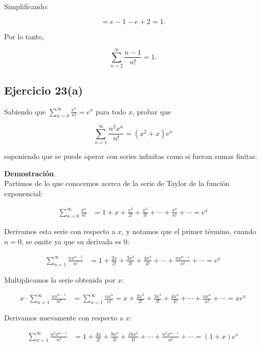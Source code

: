\documentclass{article}
\begin{document}
    Simplificando:

    $$
    = e - 1 - e + 2 = 1.
    $$

    Por lo tanto,

    $$
    \sum_{n=2}^{\infty} \frac{n-1}{n!} = 1.
    $$

    \subsection*{Ejercicio 23(a)}

    Sabiendo que $\sum_{n=0}^{\infty} \frac{x^{n}}{n!}=e^{x}$ para todo $x$, probar que

    $$
    \sum_{n=1}^{\infty} \frac{n^{2} x^{n}}{n!}=\left(x^{2}+x\right) e^{x}
    $$

    suponiendo que se puede operar con series infinitas como si fueran sumas finitas.

    \textbf{Demostración}.\\

    Partimos de lo que conocemos acerca de la serie de Taylor de la función exponencial:

    \begin{align*}
    \sum_{n=0}^{\infty} \frac{x^{n}}{n!} &= 1 + x + \frac{x^{2}}{2!} + \frac{x^{3}}{3!} + \cdots + \frac{x^{n}}{n!} + \cdots = e^{x}
    \end{align*}

    Derivamos esta serie con respecto a \( x \), y notamos que el primer término, cuando \( n=0 \), se omite ya que su derivada es 0:

    \begin{align*}
    \sum_{n=1}^{\infty} \frac{n x^{n-1}}{n!} &= 1 + \frac{2 x}{2!} + \frac{3 x^{2}}{3!} + \frac{4 x^{3}}{4!} + \cdots + \frac{n x^{n-1}}{n!} + \cdots = e^{x}
    \end{align*}

    Multiplicamos la serie obtenida por \( x \):

    \begin{align*}
    x \cdot \sum_{n=1}^{\infty} \frac{n x^{n-1}}{n!} &= \sum_{n=1}^{\infty} \frac{n x^{n}}{n!} = x + \frac{2 x^{2}}{2!} + \frac{3 x^{3}}{3!} + \frac{4 x^{4}}{4!} + \cdots + \frac{n x^{n}}{n!} + \cdots = x e^{x}
    \end{align*}

    Derivamos nuevamente con respecto a \( x \):

    \begin{align*}
    \sum_{n=1}^{\infty} \frac{n^{2} x^{n-1}}{n!} &= 1 + \frac{4 x}{2!} + \frac{9 x^{2}}{3!} + \frac{16 x^{3}}{4!} + \cdots + \frac{n^{2} x^{n-1}}{n!} + \cdots = (1 + x) e^{x}
    \end{align*}
\end{document}
